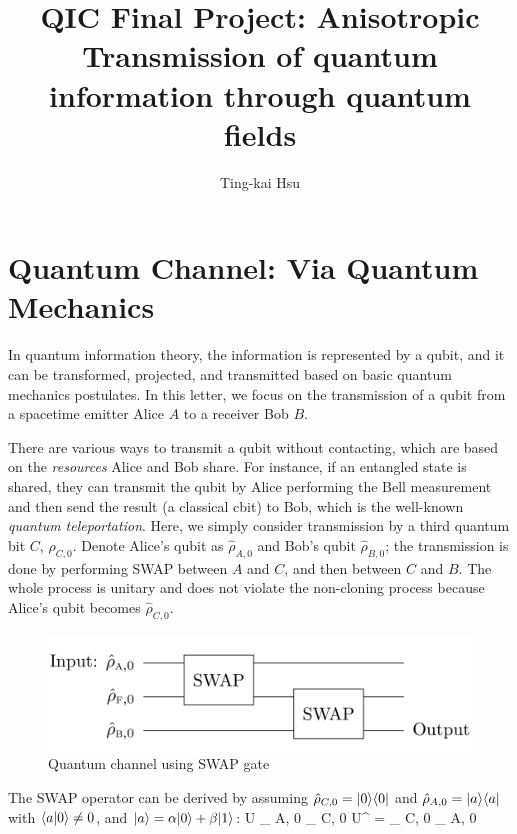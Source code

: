 \documentclass[a4paper,12pt]{article}
\title{QIC Final Project: Anisotropic Transmission of quantum information through quantum fields}
\author{Ting-kai Hsu}
\affiliation{National Taiwan University,\\
Taipei, Taiwan}
\begin{document}
\maketitle
\flushbottom
\section{Quantum Channel: Via Quantum Mechanics}
In quantum information theory, the information is represented by a qubit, and it can be transformed, projected, and transmitted based on basic quantum mechanics postulates.
In this letter, we focus on the transmission of a qubit from a spacetime emitter Alice $ A $ to a receiver Bob $ B $.

There are various ways to transmit a qubit without contacting, which are based on the \textit{resources} Alice and Bob share.
For instance, if an entangled state is shared, they can transmit the qubit by Alice performing the Bell measurement and then send the result (a classical cbit) to Bob, which is the well-known \textit{quantum teleportation}.
Here, we simply consider transmission by a third quantum bit $ C $, $ \hat \rho_{ C, 0 } $.
Denote Alice's qubit as $ \hat \rho_{ A, 0 } $ and Bob's qubit $ \hat \rho_{ B, 0 }$; the transmission is done by performing SWAP between $ A $ and $ C $, and then between $ C $ and $ B $. 
The whole process is unitary and does not violate the non-cloning process because Alice's qubit becomes $ \hat \rho_{ C, 0 } $.

\begin{figure}[H]
    \centering
    \includegraphics[width=0.75\linewidth]{swap.png}
    \caption{Quantum channel using SWAP gate\cite{PhysRevD.101.036014}}
    \label{fig:swap}
\end{figure}

The SWAP operator can be derived by assuming $ \hat \rho_{ C, 0 } = | 0 \rangle \langle 0 |$ and $ \hat \rho_{ A, 0 } = | a \rangle \langle a | $ with $ \langle a | 0 \rangle \ne 0 $, and $ | a \rangle = \alpha | 0 \rangle + \beta | 1 \rangle $:
\be
    U \rho_{ A, 0 } \otimes \rho_{ C, 0 } U^{\dagger} = \rho_{ C, 0 } \otimes \rho_{ A, 0 }
\ee
\end{document}
